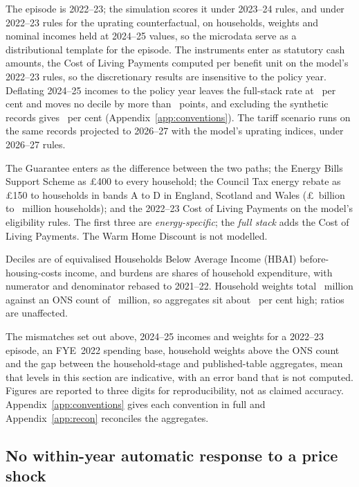  The episode is 2022--23; the
simulation scores it under 2023--24 rules, and under 2022--23 rules
for the uprating counterfactual, on households, weights and nominal
incomes held at 2024--25 values, so the microdata serve as a
distributional template for the episode. The instruments enter as
statutory cash amounts, the Cost of Living Payments computed per
benefit unit on the model's 2022--23 rules, so the discretionary
results are insensitive to the policy year. Deflating 2024--25 incomes to the policy year leaves the
full-stack rate at \SsDeflFullRatePct\ per cent and moves no decile by
more than \SsDeflMaxDecileDiffPp\ points, and excluding the synthetic
records gives \SsNoSynDiscretionaryRatePct\ per cent
(Appendix~\ref{app:conventions}). The tariff scenario runs on the same
records projected to 2026--27 with the model's uprating indices, under
2026--27 rules.

 The Guarantee enters as the difference between
the two paths; the Energy Bills Support Scheme as \pounds 400 to every
household; the Council Tax energy rebate as \pounds 150 to households
in bands A to D in England, Scotland and Wales
(\pounds\SsCtrBn\ billion to \SsCtrHouseholdsM\ million households);
and the 2022--23 Cost of Living Payments on the model's eligibility
rules. The first three are \emph{energy-specific}; the \emph{full
stack} adds the Cost of Living Payments. The Warm Home Discount is not
modelled.

 Deciles are of equivalised Households Below Average Income (HBAI)
before-housing-costs income, and burdens are shares of household
expenditure, with numerator and denominator rebased to 2021--22.
Household weights total \SsWeightedHouseholdsM\ million against an ONS
count of \SsOnsHouseholdsM\ million, so aggregates sit about
\SsWeightExcessPct\ per cent high; ratios are unaffected.

 The mismatches set out above, 2024--25 incomes and
weights for a 2022--23 episode, an FYE~2022 spending base, household
weights above the ONS count and the gap between the household-stage
and published-table aggregates, mean that levels in this section are
indicative, with an error band that is not computed. Figures are
reported to three digits for reproducibility, not as claimed accuracy.
Appendix~\ref{app:conventions} gives each convention in full and
Appendix~\ref{app:recon} reconciles the aggregates.

\subsection{No within-year automatic response to a price shock}

